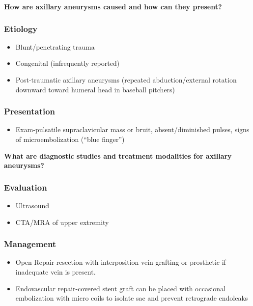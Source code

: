 \documentclass[
]{book}
\providecommand{\tightlist}{%
  \setlength{\itemsep}{0pt}\setlength{\parskip}{0pt}}
\begin{document}
\textbf{How are axillary aneurysms caused and how can they present?}

\hypertarget{etiology-1}{%
\subsubsection{Etiology}\label{etiology-1}}

\begin{itemize}
\item
  Blunt/penetrating trauma
\item
  Congenital (infrequently reported)
\item
  Post-traumatic axillary aneurysms (repeated abduction/external
  rotation downward toward humeral head in baseball pitchers)
\end{itemize}

\hypertarget{presentation-1}{%
\subsubsection{Presentation}\label{presentation-1}}

\begin{itemize}
\tightlist
\item
  Exam-pulsatile supraclavicular mass or bruit, absent/diminished
  pulses, signs of microembolization (``blue finger'')
\end{itemize}

\textbf{What are diagnostic studies and treatment modalities for axillary
aneurysms?}

\hypertarget{evaluation-2}{%
\subsubsection{Evaluation}\label{evaluation-2}}

\begin{itemize}
\item
  Ultrasound
\item
  CTA/MRA of upper extremity
\end{itemize}

\hypertarget{management-3}{%
\subsubsection{Management}\label{management-3}}

\begin{itemize}
\item
  Open Repair-resection with interposition vein grafting or prosthetic
  if inadequate vein is present.
\item
  Endovascular repair-covered stent graft can be placed with
  occasional embolization with micro coils to isolate sac and prevent
  retrograde endoleaks
\end{itemize}
\end{document}
